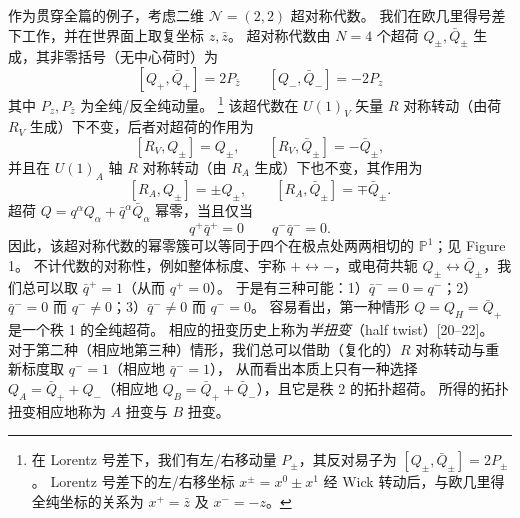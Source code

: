 作为贯穿全篇的例子，考虑二维 $\mathcal{N}=(2,2)$ 超对称代数。
我们在欧几里得号差下工作，并在世界面上取复坐标 $z,\bar z$。
超对称代数由 $N=4$ 个超荷 $Q_\pm,\bar Q_\pm$ 生成，其非零括号（无中心荷时）为
\begin{equation}\tag{2.4}
[Q_+,\bar Q_+]=2P_{\bar z}\qquad [Q_-,\bar Q_-]=-2P_z
\end{equation}
其中 $P_z,P_{\bar z}$ 为全纯/反全纯动量。
\footnote{在 Lorentz 号差下，我们有左/右移动量 $P_\pm$，其反对易子为 $[Q_\pm,\bar Q_\pm]=2P_\pm$。
Lorentz 号差下的左/右移坐标 $x^\pm=x^0\pm x^1$ 经 Wick 转动后，与欧几里得全纯坐标的关系为 $x^+=\bar z$ 及 $x^-=-z$。}
该超代数在 $U(1)_V$ 矢量 $R$ 对称转动（由荷 $R_V$ 生成）下不变，后者对超荷的作用为
\begin{equation}\tag{2.5} [R_V,Q_\pm]=Q_\pm,\qquad [R_V,\bar Q_\pm]=-\bar Q_\pm, \end{equation}
并且在 $U(1)_A$ 轴 $R$ 对称转动（由 $R_A$ 生成）下也不变，其作用为
\begin{equation}\tag{2.6} [R_A,Q_\pm]=\pm Q_\pm,\qquad [R_A,\bar Q_\pm]=\mp\bar Q_\pm. \end{equation}
超荷 $Q=q^\alpha Q_\alpha+\bar q^\alpha\bar Q_\alpha$ 幂零，当且仅当
\begin{equation}\tag{2.7}
q^+\bar q^+=0\qquad q^-\bar q^-=0.
\end{equation}
因此，该超对称代数的幂零簇可以等同于四个在极点处两两相切的 $\mathbb{P}^1$；见 Figure 1。
不计代数的对称性，例如整体标度、宇称 $+\leftrightarrow-$，或电荷共轭 $Q_\pm\leftrightarrow\bar Q_\pm$，我们总可以取 $\bar q^+=1$（从而 $q^+=0$）。
于是有三种可能：1）$\bar q^-=0=q^-$；2）$\bar q^-=0$ 而 $q^-\neq0$；3）$\bar q^-\neq0$ 而 $q^-=0$。
容易看出，第一种情形 $Q=Q_H=\bar Q_+$ 是一个秩 1 的全纯超荷。
相应的扭变历史上称为\emph{半扭变}（half twist）[20--22]。
对于第二种（相应地第三种）情形，我们总可以借助（复化的）$R$ 对称转动与重新标度取 $q^-=1$（相应地 $\bar q^-=1$），
从而看出本质上只有一种选择 $Q_A=\bar Q_++Q_-$（相应地 $Q_B=\bar Q_++\bar Q_-$），且它是秩 2 的拓扑超荷。
所得的拓扑扭变相应地称为 $A$ 扭变与 $B$ 扭变。
